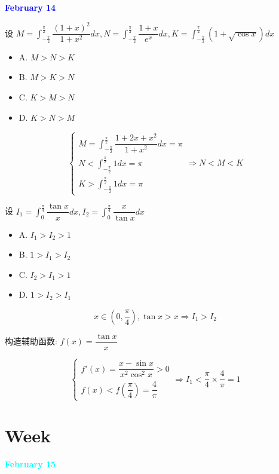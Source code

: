 \textcolor{blue}{\textbf{February 14}}

\begin{example}[][Exam: 28.2.13]
	设 $M=\int_{-\frac{\pi}{2}}^{\frac{\pi}{2}}\dfrac{(1+x)^{2}}{1+x^{2}}dx,N=\int_{-\frac{\pi}{2}}^{\frac{\pi}{2}}\dfrac{1+x}{e^{x}}dx,K=\int_{-\frac{\pi}{2}}^{\frac{\pi}{2}}(1+\sqrt{\cos x})dx$
\begin{itemize}
	\item A. $M>N>K$
	\item B. $M>K>N$
	\item C. $K>M>N$
	\item D. $K>N>M$
\end{itemize}
\end{example}
\begin{solution}
	$$\begin{cases}
	  M = \int_{-\frac{\pi}{2}}^{\frac{\pi}{2}}\dfrac{1+2x+x^{2}}{1+x^{2}}dx = \pi\\
	  N < \int_{-\frac{\pi}{2}}^{\frac{\pi}{2}}1dx = \pi\\
	  K > \int_{-\frac{\pi}{2}}^{\frac{\pi}{2}}1dx = \pi
	\end{cases}\Rightarrow N < M < K$$
\end{solution}

\begin{example}[][Exam: 28.2.14]
	设 $I_{1}=\int_{0}^{\frac{\pi}{4}}\dfrac{\tan x}{x}dx,I_{2}=\int_{0}^{\frac{\pi}{4}}\dfrac{x}{\tan x}dx$
\begin{itemize}
	\item A. $I_{1}>I_{2}>1$
	\item B. $1>I_{1}>I_{2}$
	\item C. $I_{2}>I_{1}>1$
	\item D. $1>I_{2}>I_{1}$
\end{itemize}
\end{example}
\begin{solution}
	$$x \in (0,\dfrac{\pi}{4}), \tan x > x\Rightarrow I_{1} > I_{2}$$

	构造辅助函数: $f(x) = \dfrac{\tan x}{x}$

	$$\begin{cases}
	  f'(x) = \dfrac{x-\sin x}{x^{2}\cos^{2}x} > 0\\
	  f(x) < f(\dfrac{\pi}{4}) = \dfrac{4}{\pi}
	\end{cases}\Rightarrow I_{1} < \dfrac{\pi}{4}\times \dfrac{4}{\pi} = 1$$
\end{solution}

\section{Week }
\textcolor{cyan}{\textbf{February 15}}

